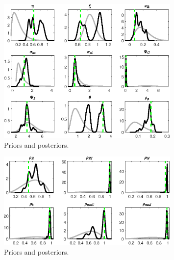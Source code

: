 \begin{figure}[H]
\centering
\includegraphics[width=0.80\textwidth]{BRS_sectoral_KK/Output/BRS_sectoral_KK_PriorsAndPosteriors3}
\caption{Priors and posteriors.}\label{Fig:PriorsAndPosteriors:3}
\end{figure}
 
\begin{figure}[H]
\centering
\includegraphics[width=0.80\textwidth]{BRS_sectoral_KK/Output/BRS_sectoral_KK_PriorsAndPosteriors4}
\caption{Priors and posteriors.}\label{Fig:PriorsAndPosteriors:4}
\end{figure}
 
